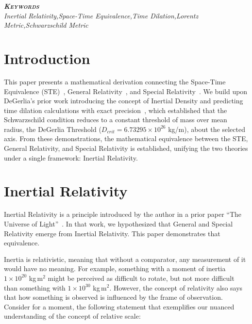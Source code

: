 \documentclass[a4paper,11pt]{article}
\begin{document}
{\fontsize{13}{15}\selectfont\bfseries\itshape\scshape Keywords}\\[6pt]
{\fontsize{10}{12}\selectfont\itshape Inertial Relativity,\hspace{6em}Space-Time Equivalence,\hspace{6em}Time Dilation,\hspace{6em}Lorentz Metric,\hspace{6em}Schwarzschild Metric}\\[18pt]

\section{Introduction}
This paper presents a mathematical derivation connecting the Space-Time Equivalence (STE)~\cite{degerlia2025universe}, General Relativity~\cite{einstein1915}, and Special Relativity~\cite{einstein1905}. We build upon DeGerlia's prior work introducing the concept of Inertial Density and predicting time dilation calculations with exact precision~\cite{degerlia2025}, which established that the Schwarzschild condition reduces to a constant threshold of mass over mean radius, the DeGerlia Threshold ($D_{crit} = 6.73295 \times 10^{26}$ kg/m), about the selected axis. From these demonstrations, the mathematical equivalence between the STE, General Relativity, and Special Relativity is established, unifying the two theories under a single framework: Inertial Relativity.

\section{Inertial Relativity}
Inertial Relativity is a principle introduced by the author in a prior paper ``The Universe of Light''~\cite{degerlia2025universe}. In that work, we hypothesized that General and Special Relativity emerge from Inertial Relativity. This paper demonstrates that equivalence.

Inertia is relativistic, meaning that without a comparator, any measurement of it would have no meaning. For example, something with a moment of inertia $1 \times 10^{20}$ kg\,m$^2$ might be perceived as difficult to rotate, but not more difficult than something with $1 \times 10^{30}$ kg\,m$^2$. However, the concept of relativity also says that how something is observed is influenced by the frame of observation. Consider for a moment, the following statement that exemplifies our nuanced understanding of the concept of relative scale:
\end{document}

